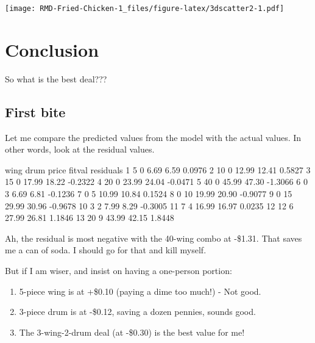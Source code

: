 \documentclass[
]{article}
\newenvironment{Shaded}{\begin{snugshade}}{\end{snugshade}}
\newcommand{\NormalTok}[1]{#1}
\newcommand{\OtherTok}[1]{\textcolor[rgb]{0.56,0.35,0.01}{#1}}
\newcommand{\SpecialCharTok}[1]{\textcolor[rgb]{0.00,0.00,0.00}{#1}}
\providecommand{\tightlist}{%
  \setlength{\itemsep}{0pt}\setlength{\parskip}{0pt}}
\begin{document}
\texttt{[image: RMD-Fried-Chicken-1\_files/figure-latex/3dscatter2-1.pdf]}

\hypertarget{conclusion}{%
\section{Conclusion}\label{conclusion}}

So what is the best deal???

\hypertarget{first-bite}{%
\subsection{First bite}\label{first-bite}}

Let me compare the predicted values from the model with the actual
values. In other words, look at the residual values.

\begin{Shaded}
\end{Shaded}

wing drum price fitval residuals 1 5 0 6.69 6.59 0.0976 2 10 0 12.99
12.41 0.5827 3 15 0 17.99 18.22 -0.2322 4 20 0 23.99 24.04 -0.0471 5 40
0 45.99 47.30 -1.3066 6 0 3 6.69 6.81 -0.1236 7 0 5 10.99 10.84 0.1524 8
0 10 19.99 20.90 -0.9077 9 0 15 29.99 30.96 -0.9678 10 3 2 7.99 8.29
-0.3005 11 7 4 16.99 16.97 0.0235 12 12 6 27.99 26.81 1.1846 13 20 9
43.99 42.15 1.8448

Ah, the residual is most negative with the 40-wing combo at -\$1.31.
That saves me a can of soda. I should go for that and kill myself.

But if I am wiser, and insist on having a one-person portion:

\begin{enumerate}
\def\labelenumi{\arabic{enumi}.}
\tightlist
\item
  5-piece wing is at +\$0.10 (paying a dime too much!) - Not good.
\item
  3-piece drum is at -\$0.12, saving a dozen pennies, sounds good.
\item
  The 3-wing-2-drum deal (at -\$0.30) is the best value for me!
\end{enumerate}
\end{document}
